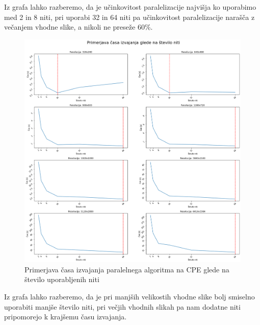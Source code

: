 \documentclass[11pt]{article}
\begin{document}
Iz grafa lahko razberemo, da je učinkovitost paralelizacije najvišja ko uporabimo med 2 in 8 niti,
pri uporabi 32 in 64 niti pa učinkovitost paralelizacije narašča z večanjem vhodne slike, a nikoli ne preseže 60\%.

\begin{figure}[H]
    \label{img:thread_comp}
    \centering
    \includegraphics[scale=0.28]{thread_comp.png}
    \caption{Primerjava časa izvajanja paralelnega algoritma na CPE glede na število uporabljenih niti}
\end{figure}

\bigskip\noindent
Iz grafa lahko razberemo, da je pri manjših velikostih vhodne slike bolj smiselno uporabiti manjše število niti,
pri večjih vhodnih slikah pa nam dodatne niti pripomorejo k krajšemu času izvajanja.
\end{document}
